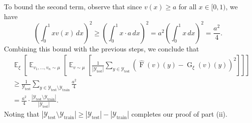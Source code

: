 \documentclass[11pt]{article}
\theoremstyle{plain}
\newcommand{\Ycal}{\mathcal{Y}}
\DeclareMathOperator*{\expect}{\mathbb{E}}
\begin{document}
To bound the second term, observe that since $ v(x) \geq a $ for all $ x \in [0,1) $, we have
\[
\left( \int_0^1 x v(x)\, dx \right)^2 
\geq \left( \int_0^1 x \cdot a \, dx \right)^2 
= a^2 \left( \int_0^1 x\, dx \right)^2 
= \frac{a^2}{4}.
\]
Combining this bound with the previous steps, we conclude that
\begin{equation*}
\begin{split}
&    \expect_{\xi} \left[ \expect_{v_1, \ldots, v_n \sim \mu} \left[ \expect_{v \sim \mu} \left[ 
    \frac{1}{|\Ycal_{\text{test}}|} \sum_{y \in \Ycal_{\text{test}}} \left( \widehat{\operatorname{F}}(v)(y) - \operatorname{G}_{\xi}(v)(y) \right)^2
    \right] \right] \right] \\
&\geq \frac{1}{\mathcal{Y}_{\text{test}}} \sum_{y \in \mathcal{Y}_{\text{test}} \setminus \mathcal{Y}_{\text{train}}} \frac{a^2}{4} \\
&= \frac{a^2}{4} \cdot \frac{|\mathcal{Y}_{\text{test}} \setminus \mathcal{Y}_{\text{train}}|}{|\mathcal{Y}_{\text{test}}|}.
\end{split}
\end{equation*}
Noting that $|\mathcal{Y}_{\text{test}} \setminus \mathcal{Y}_{\text{train}}| \geq |\mathcal{Y}_{\text{test}} |- |\mathcal{Y}_{\text{train}} |$ completes our proof of part (ii).
\end{document}
